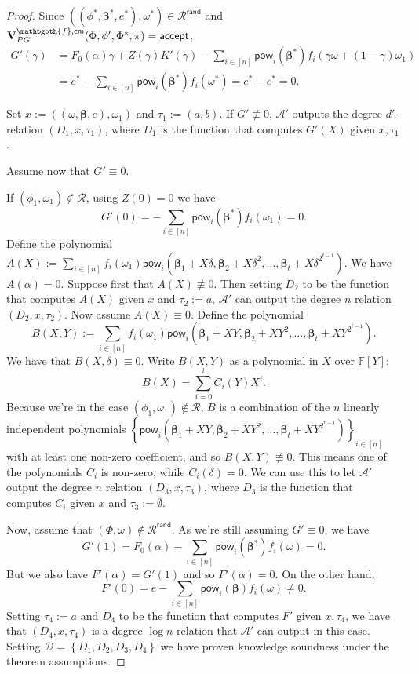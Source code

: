 \documentclass[11pt]{article} %
\newcommand{\F}{\ensuremath{\mathbb F}\xspace}
\newcommand{\advprime}{\ensuremath{\mathcal{A}'}\xspace}
\newcommand{\cm}{\ensuremath{\mathsf{cm}}\xspace}
\newcommand{\accept}{\ensuremath{\mathsf{accept}}\xspace}
\newcommand{\defeq}{:=}
\newcommand{\sett}[2]{\ensuremath{\set{#1}_{#2}}\xspace}
\newcommand{\prf}{\ensuremath{\mathsf{\pi}}\xspace}
\newcommand{\inst}{\ensuremath{\phi}\xspace}
\newcommand{\wit}{\ensuremath{\mathsf{\omega}}\xspace}
\newcommand{\ver}{\ensuremath{\mathsf{\mathbf{V}}}\xspace}
\newcommand{\verpg}{\ensuremath{\ver^{\predinst,\cm}_{PG}}\xspace}
\newcommand{\rel}{\ensuremath{\mathcal{R}}\xspace}
\newcommand{\relrand}{\ensuremath{\mathcal{R^{\mathsf{rand}}}}\xspace}
\newcommand{\set}[1]{\ensuremath{\left\{#1\right\}}\xspace}
\newcommand{\sumi}[1]{\sum_{i\in[#1]}}
\newcommand{\betaa}{\ensuremath{\mathbf{\boldsymbol{\beta}}}\xspace}
\newcommand{\instt}{\ensuremath{\Phi^*}\xspace}
\newcommand{\insttbase}{\ensuremath{\Phi}\xspace}
\newcommand{\pow}{\ensuremath{\mathsf{pow}}\xspace}
\newcommand{\inststar}{\ensuremath{\inst^*}\xspace}
\newcommand{\witstar}{\ensuremath{\wit^*}\xspace}
\newcommand{\predinst}{\ensuremath{\mathpgoth{f}}\xspace}
\newcommand{\ztafuncs}{\ensuremath{\mathcal{D}}\xspace}
\begin{document}
\begin{proof}
Since $((\inststar,\betaa^*,e^*),\witstar)\in \relrand$ and $\verpg(\insttbase,\inst',\instt,\prf)=\accept$,
\begin{align*}
G'(\gamma) &= F_0(\alpha)\gamma + Z(\gamma)K'(\gamma)- \sum_{i\in [n]} \pow_i(\betaa^*) f_i(\gamma\wit +(1-\gamma)\wit_1) \\
           &= e^*-\sum_{i\in [n]} \pow_i(\betaa^*) f_i(\witstar) = e^*-e^* = 0.
\end{align*}

Set $x\defeq ((\wit,\betaa,e),\wit_1)$ and $\tau_1\defeq (a,b)$.
If $G'\not\equiv 0$, \advprime outputs the degree $d'$-relation $(D_1,x,\tau_1)$,
where $D_1$ is the function that computes $G'(X)$ given $x,\tau_1$.

Assume now that $G'\equiv 0$.

If $(\inst_1,\wit_1)\notin \rel$, using $Z(0)=0$ we have
\[G'(0)= -\sum_{i\in [n]}\pow_i( \betaa^*) f_i(\wit_1)=0.\]
Define the polynomial $A(X)\defeq \sumi{n}f_i(\wit_1)\pow_i(\betaa_1+X \delta,\betaa_2 +X \delta^2,\ldots,\betaa_t+X \delta^{2^{t-1}})$.
We have $A(\alpha)=0$. Suppose first that $A(X)\not\equiv 0$. Then setting $D_2$ to be the function that computes $A(X)$ given $x$ and $\tau_2\defeq a$, \advprime can output the degree $n$ relation $(D_2,x,\tau_2)$. Now assume $A(X)\equiv 0$.
Define the polynomial
\[B(X,Y)\defeq \sumi{n}f_i(\wit_1)\pow_i(\betaa_1+XY,\betaa_2+XY^2,\ldots,\betaa_t+X Y^{2^{t-1}}).\]
We have that $B(X,\delta)\equiv 0$.
Write $B(X,Y)$ as a polynomial in $X$ over $\F[Y]$:
\[B(X)=\sum_{i=0}^t C_i(Y)X^i.\]
Because we're in the case $(\inst_1,\wit_1)\notin \rel$, $B$ is a combination of the $n$ linearly independent polynomials $\sett{\pow_i(\betaa_1+XY,\betaa_2+XY^2,\ldots,\betaa_t+X Y^{2^{t-1}})}{i\in [n]}$ with at least one non-zero coefficient, and so $B(X,Y)\not\equiv 0$. This means one of the polynomials $C_i$ is non-zero, while $C_i(\delta)=0$.
We can use this to let \advprime output the degree $n$ relation $(D_3,x,\tau_3)$, where $D_3$ is the function that computes $C_i$ given $x$ and $\tau_3\defeq\emptyset$.

Now, assume that $(\insttbase,\wit)\notin \relrand$.
As we're still assuming $G'\equiv 0$, we have
\[G'(1)=F_0(\alpha)-\sumi{n}\pow_i(\betaa^*) f_i(\wit)=0.\]
But we also have $F'(\alpha)=G'(1)$ and so $F'(\alpha)=0$.
On the other hand,
\[F'(0)=e-\sumi{n}\pow_i(\betaa) f_i(\wit)\neq 0.\]
Setting $\tau_4\defeq a$ and $D_4$ to be the function that computes $F'$ given $x,\tau_4$, we
have that $(D_4,x,\tau_4)$ is a degree $\log n$ relation that \advprime can output in this case.
Setting $\ztafuncs=\set{D_1,D_2,D_3,D_4}$ we have proven knowledge soundness under the theorem assumptions.
\end{proof}
\end{document}
